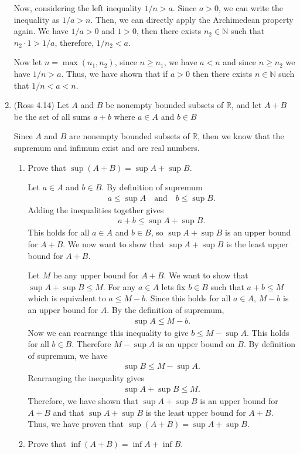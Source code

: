 \documentclass [10pt]{article}
\newcommand{\jg}[1]{{\color{blue} #1}}
\begin{document}
\begin{enumerate}
{Now, considering the left inequality $1/n > a$. Since $a>0$, we can write the inequality as $1/a > n$. Then, we can directly apply the Archimedean property again. We have $1/a > 0$ and $1 >0$, then there exists $n_2 \in \mathbb{N}$ such that $n_2 \cdot 1 > 1/a$, therefore, $1/n_2 < a$. 

Now let $n = \max (n_1, n_2)$, since $n \geq n_1$, we have $a < n$ and since $n \geq n_2$ we have $1/n > a$. Thus, we have shown that if $a>0$ then there exists $n \in \mathbb{N}$ such that $1/n < a < n$. 
}
\clearpage
\item (Ross 4.14)
Let $A$ and $B$ be nonempty bounded subsets of $\mathbb{R}$, and let $A+B$ be
the set of all sums $a+b$ where $a \in A$ and $b \in B$

\jg{
Since $A$ and $B$ are nonempty bounded subsets of $\mathbb{R}$, then we know that the supremum and infimum exist and are real numbers. 
}
\begin{enumerate}
\item Prove that $\sup (A+B)= \sup A +\sup B.$

\jg{
Let $a \in A$ and $b \in B$. By definition of supremum 
\begin{align*}
    a \leq \sup A \quad \text{and} \quad b \leq \sup B. 
\end{align*}
Adding the inequalities together gives 
\begin{align*}
    a + b \leq \sup A + \sup B.
\end{align*}
This holds for all $a \in A$ and $b \in B$, so $\sup A + \sup B$ is an upper bound for $A + B$. We now want to show that $\sup A + \sup B$ is the least upper bound for $A + B$. 

Let $M$ be any upper bound for $A + B$. We want to show that $\sup A + \sup B \leq M$. For any $a \in A$ lets fix $b \in B$ such that $a + b \leq M$ which is equivalent to $a \leq M - b$. Since this holds for all $a \in A$, $M - b$ is an upper bound for $A$. By the definition of supremum, 
\begin{align*}
    \sup A \leq M - b.
\end{align*}
Now we can rearrange this inequality to give $b \leq M - \sup A$. This holds for all $b \in B$. Therefore $M - \sup A$ is an upper bound on $B$. By definition of supremum, we have
\begin{align*}
    \sup B \leq M - \sup A.
\end{align*}
Rearranging the inequality gives 
\begin{align*}
    \sup A + \sup B \leq M.
\end{align*}
Therefore, we have shown that $\sup A + \sup B$ is an upper bound for $A + B$ and that $\sup A + \sup B$ is the least upper bound for $A + B$. Thus, we have proven that $\sup (A+B) = \sup A + \sup B$. 
}
\item Prove that $\inf(A+B) = \inf A + \inf B.$


\end{enumerate}
\end{enumerate}
\end{document}

